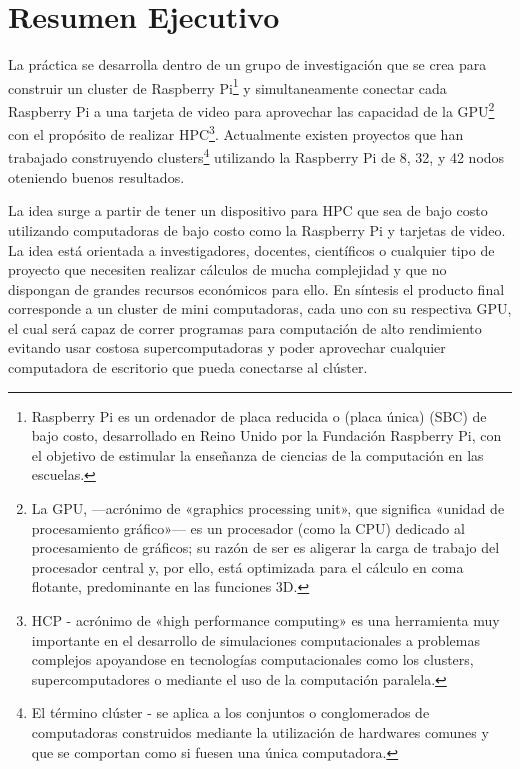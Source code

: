 \documentclass[11pt,oneside]{article}
\begin{document}
\section{Resumen Ejecutivo}
\begin{comment}
El objetivo de esta sección es que una persona no especialista que lea este resumen conozca la actividad desarrollada por el alumno, los objetivos del trabajo realizado, la metodología y los recursos empleados, logros obtenidos, aporte realizado, etc.. Su extensión no debe superar una página.
\end{comment}
La práctica se desarrolla dentro de un grupo de investigación que se crea para construir un cluster de Raspberry Pi\footnote{Raspberry Pi es un ordenador de placa reducida o (placa única) (SBC) de bajo costo, desarrollado en Reino Unido por la Fundación Raspberry Pi, con el objetivo de estimular la enseñanza de ciencias de la computación en las escuelas.} y simultaneamente conectar cada Raspberry Pi a una tarjeta de video para aprovechar las capacidad de la GPU\footnote{La GPU, —acrónimo de «graphics processing unit», que significa «unidad de procesamiento gráfico»— es un procesador (como la CPU) dedicado al procesamiento de gráficos; su razón de ser es aligerar la carga de trabajo del procesador central y, por ello, está optimizada para el cálculo en coma flotante, predominante en las funciones 3D.} con el propósito de realizar HPC\footnote{HCP - acrónimo de «high performance computing» es una herramienta muy importante en el desarrollo de simulaciones computacionales a problemas complejos apoyandose en tecnologías computacionales como los clusters, supercomputadores o mediante el uso de la computación paralela.}.  Actualmente existen proyectos que han trabajado construyendo clusters\footnote{El término clúster - se aplica a los conjuntos o conglomerados de computadoras construidos mediante la utilización de hardwares comunes y que se comportan como si fuesen una única computadora.} utilizando la Raspberry Pi de 8, 32, y 42 nodos oteniendo buenos resultados. 

La idea surge a partir de tener un dispositivo para HPC que sea de bajo costo utilizando computadoras de bajo costo como la Raspberry Pi y tarjetas de video. La idea está orientada a investigadores, docentes, científicos o cualquier tipo de proyecto que necesiten realizar cálculos de mucha complejidad y que no dispongan de grandes recursos económicos para ello. En síntesis el producto final corresponde a un cluster de mini computadoras, cada uno con su respectiva GPU, el cual será capaz de correr programas para computación de alto rendimiento evitando usar costosa supercomputadoras y poder aprovechar cualquier computadora de escritorio que pueda conectarse al clúster. 
\end{document}
